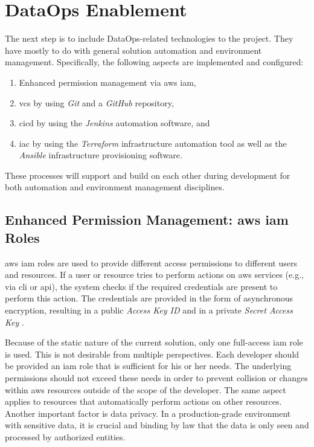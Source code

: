 \section{DataOps Enablement}
The next step is to include DataOps-related technologies to the project. They have mostly to do with general solution automation and environment management. Specifically, the following aspects are implemented and configured:

\begin{enumerate}
	\item Enhanced permission management via \acs{aws} \acf{iam},
	\item \acf{vcs} by using \textit{Git} and a \textit{GitHub} repository,
	\item \acf{cicd} by using the \textit{Jenkins} automation software, and
	\item \acf{iac} by using the \textit{Terraform} infrastructure automation tool as well as the \textit{Ansible} infrastructure provisioning software.
\end{enumerate}

These processes will support and build on each other during development for both automation and environment management disciplines.

\subsection{Enhanced Permission Management: \acs{aws} \acs{iam} Roles}
\acs{aws} \acs{iam} roles are used to provide different access permissions to different users and resources. If a user or resource tries to perform actions on \ac{aws} services (e.g., via \acs{cli} or \acs{api}), the system checks if the required credentials are present to perform this action. The credentials are provided in the form of asynchronous encryption, resulting in a public \textit{Access Key ID} and in a private \textit{Secret Access Key} \cite{iam}.

Because of the static nature of the current solution, only one full-access \ac{iam} role is used. This is not desirable from multiple perspectives. Each developer should be provided an \ac{iam} role that is sufficient for his or her needs. The underlying permissions should not exceed these needs in order to prevent collision or changes within \ac{aws} resources outside of the scope of the developer. The same aspect applies to resources that automatically perform actions on other resources. Another important factor is data privacy. In a production-grade environment with sensitive data, it is crucial and binding by law that the data is only seen and processed by authorized entities. 

